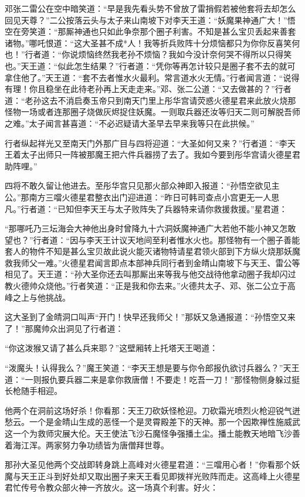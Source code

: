 \documentclass[12pt,UTF8]{ctexbook}
\begin{document}
邓张二雷公在空中暗笑道：“早是我先看头势不曾放了雷捎假若被他套将去却怎么回见天尊？”二公按落云头与太子来山南坡下对李天王道：“妖魔果神通广大！”悟空在旁笑道：“那厮神通也只如此争奈那个圈子利害。不知是甚么宝贝丢起来善套诸物。”哪吒恨道：“这大圣甚不成*人！我等折兵败阵十分烦恼都只为你你反喜笑何也！”行者道：“你说烦恼终然我老孙不烦恼？我如今没计奈何哭不得所以只得笑也。”天王道：“似此怎生结果？”行者道：“凭你等再怎计较只是圈子套不去的就可拿住他了。”天王道：“套不去者惟水火最利。常言道水火无情。”行者闻言道：“说得有理！你且稳坐在此待老孙再上天走走来。”邓、张二公道：“又去做甚的？”行者道：“老孙这去不消启奏玉帝只到南天门里上彤华宫请荧惑火德星君来此放火烧那怪物一场或者连那圈子烧做灰烬捉住妖魔。一则取兵器还汝等归天二则可解脱吾师之难。”太子闻言甚喜道：“不必迟疑请大圣早去早来我等只在此拱候。”

行者纵起祥光又至南天门外那广目与四将迎道：“大圣如何又来？”行者道：“李天王着太子出师只一阵被那魔王把六件兵器捞了去了。我如今要到彤华宫请火德星君助阵哩。”

四将不敢久留让他进去。至彤华宫只见那火部众神即入报道：“孙悟空欲见主公。”那南方三噹火德星君整衣出门迎进道：“昨日可韩司查点小宫更无一人思凡。”行者道：“已知但李天王与太子败阵失了兵器特来请你救援救援。”星君道：

“那哪吒乃三坛海会大神他出身时曾降九十六洞妖魔神通广大若他不能小神又怎敢望也？”行者道：“因与李天王计议天地间至利者惟水火也。那怪物有一个圈子善能套人的物件不知是甚么宝贝故此说火能灭诸物特请星君领火部到下方纵火烧那妖魔救我师父一难。”火德星君闻言即点本部神兵同行者到金皘山南坡下与天王、雷公等相见了。天王道：“孙大圣你还去叫那厮出来等我与他交战待他拿动圈子我却闪过教火德帅众烧他。”行者笑道：“正是我和你去来。”火德共太子、邓、张二公立于高峰之上与他挑战。

这大圣到了金皘洞口叫声“开门！快早还我师父！”那妖又急通报道：“孙悟空又来了！”那魔帅众出洞见了行者道：

“你这泼猴又请了甚么兵来耶？”这壁厢转上托塔天王喝道：

“泼魔头！认得我么？”魔王笑道：“李天王想是要与你令郎报仇欲讨兵器么？”天王道：“一则报仇要兵器二来是拿你救唐僧！不要走！吃吾一刀！”那怪物侧身躲过挺长枪随手相迎。

他两个在洞前这场好杀！你看那：天王刀砍妖怪枪迎。刀砍霜光喷烈火枪迎锐气迸愁云。一个是金皘山生成的恶怪一个是灵霄殿差下的天神。那一个因欺禅性施威武这一个为救师灾展大伦。天王使法飞沙石魔怪争强播土尘。播土能教天地暗飞沙善着海江浑。两家努力争功绩皆为唐僧拜世尊。

那孙大圣见他两个交战即转身跳上高峰对火德星君道：“三噹用心者！”你看那个妖魔与天王正斗到好处却又取出圈子来天王看见即拨祥光败阵而走。这高峰上火德星君忙传号令教众部火神一齐放火。这一场真个利害。好火：
\end{document}
